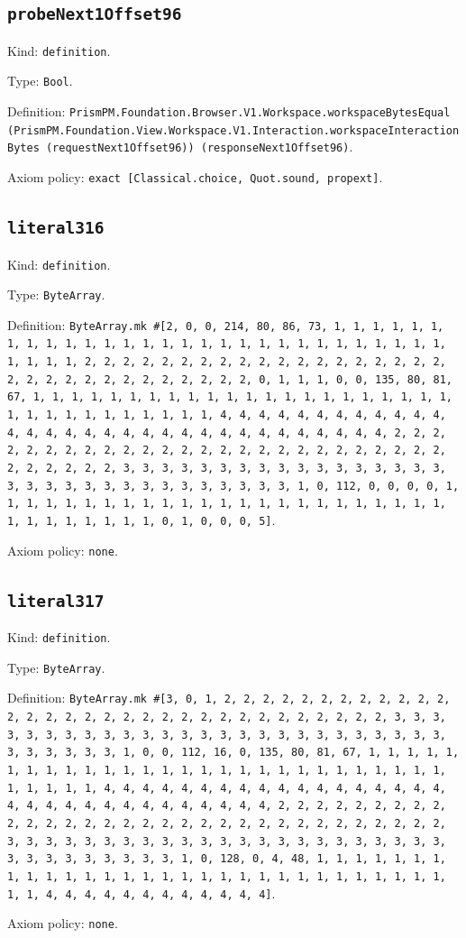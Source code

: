 \documentclass[11pt]{article}
\begin{document}
\subsection*{\texttt{probeNext1Offset96}}
\noindent Kind: \texttt{definition}.\par
\noindent Type: \texttt{Bool}.\par
\noindent Definition: \texttt{PrismPM.Foundation.Browser.V1.Workspace.workspaceBytesEqual (PrismPM.Foundation.View.Workspace.V1.Interaction.workspaceInteractionBytes (requestNext1Offset96)) (responseNext1Offset96)}.\par
\noindent Axiom policy: \texttt{exact [Classical.choice, Quot.sound, propext]}.\par
\subsection*{\texttt{literal316}}
\noindent Kind: \texttt{definition}.\par
\noindent Type: \texttt{ByteArray}.\par
\noindent Definition: \texttt{ByteArray.mk \#[2, 0, 0, 214, 80, 86, 73, 1, 1, 1, 1, 1, 1, 1, 1, 1, 1, 1, 1, 1, 1, 1, 1, 1, 1, 1, 1, 1, 1, 1, 1, 1, 1, 1, 1, 1, 1, 1, 1, 1, 2, 2, 2, 2, 2, 2, 2, 2, 2, 2, 2, 2, 2, 2, 2, 2, 2, 2, 2, 2, 2, 2, 2, 2, 2, 2, 2, 2, 2, 2, 2, 2, 0, 1, 1, 1, 0, 0, 135, 80, 81, 67, 1, 1, 1, 1, 1, 1, 1, 1, 1, 1, 1, 1, 1, 1, 1, 1, 1, 1, 1, 1, 1, 1, 1, 1, 1, 1, 1, 1, 1, 1, 1, 1, 1, 4, 4, 4, 4, 4, 4, 4, 4, 4, 4, 4, 4, 4, 4, 4, 4, 4, 4, 4, 4, 4, 4, 4, 4, 4, 4, 4, 4, 4, 4, 4, 4, 2, 2, 2, 2, 2, 2, 2, 2, 2, 2, 2, 2, 2, 2, 2, 2, 2, 2, 2, 2, 2, 2, 2, 2, 2, 2, 2, 2, 2, 2, 2, 2, 3, 3, 3, 3, 3, 3, 3, 3, 3, 3, 3, 3, 3, 3, 3, 3, 3, 3, 3, 3, 3, 3, 3, 3, 3, 3, 3, 3, 3, 3, 3, 3, 1, 0, 112, 0, 0, 0, 0, 1, 1, 1, 1, 1, 1, 1, 1, 1, 1, 1, 1, 1, 1, 1, 1, 1, 1, 1, 1, 1, 1, 1, 1, 1, 1, 1, 1, 1, 1, 1, 1, 0, 1, 0, 0, 0, 5]}.\par
\noindent Axiom policy: \texttt{none}.\par
\subsection*{\texttt{literal317}}
\noindent Kind: \texttt{definition}.\par
\noindent Type: \texttt{ByteArray}.\par
\noindent Definition: \texttt{ByteArray.mk \#[3, 0, 1, 2, 2, 2, 2, 2, 2, 2, 2, 2, 2, 2, 2, 2, 2, 2, 2, 2, 2, 2, 2, 2, 2, 2, 2, 2, 2, 2, 2, 2, 2, 2, 2, 3, 3, 3, 3, 3, 3, 3, 3, 3, 3, 3, 3, 3, 3, 3, 3, 3, 3, 3, 3, 3, 3, 3, 3, 3, 3, 3, 3, 3, 3, 3, 3, 1, 0, 0, 112, 16, 0, 135, 80, 81, 67, 1, 1, 1, 1, 1, 1, 1, 1, 1, 1, 1, 1, 1, 1, 1, 1, 1, 1, 1, 1, 1, 1, 1, 1, 1, 1, 1, 1, 1, 1, 1, 1, 1, 4, 4, 4, 4, 4, 4, 4, 4, 4, 4, 4, 4, 4, 4, 4, 4, 4, 4, 4, 4, 4, 4, 4, 4, 4, 4, 4, 4, 4, 4, 4, 4, 2, 2, 2, 2, 2, 2, 2, 2, 2, 2, 2, 2, 2, 2, 2, 2, 2, 2, 2, 2, 2, 2, 2, 2, 2, 2, 2, 2, 2, 2, 2, 2, 3, 3, 3, 3, 3, 3, 3, 3, 3, 3, 3, 3, 3, 3, 3, 3, 3, 3, 3, 3, 3, 3, 3, 3, 3, 3, 3, 3, 3, 3, 3, 3, 1, 0, 128, 0, 4, 48, 1, 1, 1, 1, 1, 1, 1, 1, 1, 1, 1, 1, 1, 1, 1, 1, 1, 1, 1, 1, 1, 1, 1, 1, 1, 1, 1, 1, 1, 1, 1, 1, 4, 4, 4, 4, 4, 4, 4, 4, 4, 4, 4, 4]}.\par
\noindent Axiom policy: \texttt{none}.\par
\end{document}
